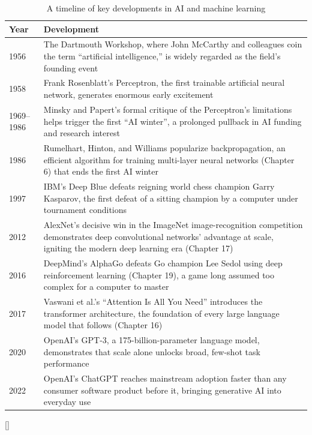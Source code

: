 \documentclass[../ai_in_finance]{subfiles}
\begin{document}
\begin{table}[htbp]
\centering
\begin{lrbox}{\bookmeasuredbox}
\begin{tabular}{p{2.4cm}p{9.6cm}}
\toprule
Year & Development \\
\midrule
1956 & The Dartmouth Workshop\index{Dartmouth Workshop}, where John McCarthy and colleagues coin the term ``artificial intelligence,'' is widely regarded as the field's founding event \\
1958 & Frank Rosenblatt's Perceptron\index{Perceptron}, the first trainable artificial neural network, generates enormous early excitement \\
1969--1986 & Minsky and Papert's formal critique of the Perceptron's limitations helps trigger the first ``AI winter\index{AI Winter}'', a prolonged pullback in AI funding and research interest \\
1986 & Rumelhart, Hinton, and Williams popularize backpropagation\index{backpropagation}, an efficient algorithm for training multi-layer neural networks (Chapter 6) that ends the first AI winter \\
1997 & IBM's Deep Blue\index{Deep Blue} defeats reigning world chess champion Garry Kasparov, the first defeat of a sitting champion by a computer under tournament conditions \\
2012 & AlexNet\index{AlexNet}'s decisive win in the ImageNet\index{ImageNet} image-recognition competition demonstrates deep convolutional networks' advantage at scale, igniting the modern deep learning era (Chapter 17) \\
2016 & DeepMind's AlphaGo\index{AlphaGo} defeats Go champion Lee Sedol using deep reinforcement learning (Chapter 19), a game long assumed too complex for a computer to master \\
2017 & Vaswani et al.'s ``Attention Is All You Need'' introduces the transformer architecture\index{transformer architecture}, the foundation of every large language model that follows (Chapter 16) \\
2020 & OpenAI's GPT-3\index{GPT-3}, a 175-billion-parameter language model, demonstrates that scale alone unlocks broad, few-shot task performance \\
2022 & OpenAI's ChatGPT\index{ChatGPT} reaches mainstream adoption faster than any consumer software product before it, bringing generative AI into everyday use \\
\bottomrule
\end{tabular}
\end{lrbox}
\ifdim\wd\bookmeasuredbox<0.65\linewidth
\setlength{\bookcapwidth}{0.65\linewidth}
\else
\setlength{\bookcapwidth}{\wd\bookmeasuredbox}
\fi
{}[\bookcapwidth]{
\usebox{\bookmeasuredbox}
}{
\caption{A timeline of key developments in AI and machine learning}
\label{tab:ai_ml_timeline}
}
\end{table}
\end{document}
